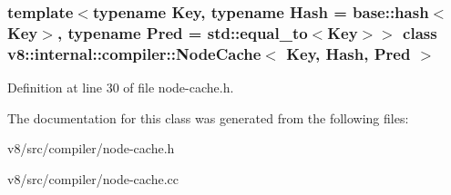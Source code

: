 \subsubsection*{template$<$typename Key, typename Hash = base\+::hash$<$\+Key$>$, typename Pred = std\+::equal\+\_\+to$<$\+Key$>$$>$\newline
class v8\+::internal\+::compiler\+::\+Node\+Cache$<$ Key, Hash, Pred $>$}



Definition at line 30 of file node-\/cache.\+h.



The documentation for this class was generated from the following files\+:\begin{DoxyCompactItemize}
\item 
v8/src/compiler/node-\/cache.\+h\item 
v8/src/compiler/node-\/cache.\+cc\end{DoxyCompactItemize}
